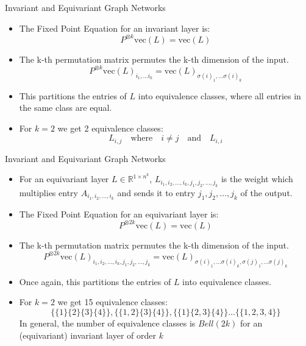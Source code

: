 \documentclass{beamer}
\begin{document}
\begin{frame}{Invariant and Equivariant Graph Networks}
    \begin{itemize}
        \setlength{\itemsep}{\fill}
        \item The Fixed Point Equation for an invariant layer is:
        \[ P^{\otimes k}\text{vec}(L) = \text{vec}(L) \]
        \item The k-th permutation matrix permutes the k-th dimension of the input. 
        \[ P^{\otimes k}\text{vec}(L)_{i_1, \ldots i_k} = \text{vec}(L)_{\sigma(i)_1, \ldots \sigma(i)_k} \]
        \item This partitions the entries of $L$ into equivalence classes, where all entries in the same class are equal.
        \item For $k=2$ we get 2 equivalence classes:
        \[ L_{i,j} \quad \text{where} \quad i \neq j \quad \text{and} \quad L_{i,i} \]
    \end{itemize}
\end{frame}
\begin{frame}{Invariant and Equivariant Graph Networks}
    \begin{itemize}
        \setlength{\itemsep}{\fill}
        \item For an equivariant layer $L \in \mathbb{R}^{1 \times n^k}$, $L_{i_1,i_2,\ldots,i_k, j_1, j_2,\ldots,j_k}$ is the weight which multiplies entry $A_{i_1,i_2,\ldots,i_k}$ 
        and sends it to entry ${j_1,j_2,\ldots,j_k}$ of the output.
        \item The Fixed Point Equation for an equivariant layer is:
        \[ P^{\otimes 2k}\text{vec}(L) = \text{vec}(L) \]
        \item The k-th permutation matrix permutes the k-th dimension of the input. 
        \[ P^{\otimes 2k}\text{vec}(L)_{i_1,i_2,\ldots,i_k, j_1, j_2,\ldots,j_k} = \text{vec}(L)_{\sigma(i)_1, \ldots \sigma(i)_k, \sigma(j)_1, \ldots \sigma(j)_k} \]
        \item Once again, this partitions the entries of $L$ into equivalence classes.
        \item For $k=2$ we get 15 equivalence classes:
        \[ \{\{1\} \{2\} \{3\} \{4\}\}, \{\{1, 2\} \{3\} \{4\}\}, \{\{1\} \{2, 3\} \{4\}\} \ldots \{\{1, 2, 3, 4\}\}\]
        In general, the number of equivalence classes is $Bell(2k)$ for an (equivariant) invariant layer of order $k$
    \end{itemize}
\end{frame}
\end{document}
